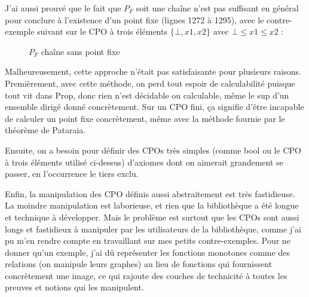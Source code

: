 \documentclass{article}
\newcommand\code[1]{{\fontfamily{lmtt}\selectfont #1}}
\theoremstyle{definition}
\begin{document}
J'ai aussi prouvé que le fait que $P_F$ soit une chaîne n'est pas suffisant en général pour conclure à l'existence d'un point fixe (lignes 1272 à 1295), avec le contre-exemple suivant sur le CPO à trois éléments $\{\bot, x1, x2 \}$ avec $\bot \leq x1 \leq x2$ :

\begin{figure}[ht]
\centering
\resizebox{0.09\linewidth}{!}
	{
	}
\caption{$P_F$ chaîne sans point fixe}
\end{figure}

\bigskip

Malheureusement, cette approche n'était pas satisfaisante pour plusieurs raisons. Premièrement, avec cette méthode, on perd tout espoir de calculabilité puisque tout vit dans \code{Prop}, donc rien n'est décidable ou calculable, même le sup d'un ensemble dirigé donné concrètement. Sur un CPO fini, ça signifie d'être incapable de calculer un point fixe concrètement, même avec la méthode fournie par le théorème de Pataraia.

Ensuite, on a besoin pour définir des CPOs très simples (comme \code{bool} ou le CPO à trois éléments utilisé ci-dessus) d'axiomes dont on aimerait grandement se passer, en l'occurrence le tiers exclu.

Enfin, la manipulation des CPO définis aussi abstraitement est très fastidieuse. La moindre manipulation est laborieuse, et rien que la bibliothèque a été longue et technique à développer. Mais le problème est surtout que les CPOs sont aussi longs et fastidieux à manipuler par les utilisateurs de la bibliothèque, comme j'ai pu m'en rendre compte en travaillant sur mes petits contre-exemples. Pour ne donner qu'un exemple, j'ai dû représenter les fonctions monotones comme des relations (on manipule leurs graphes) au lieu de fonctions qui fournissent concrètement une image, ce qui rajoute des couches de technicité à toutes les preuves et notions qui les manipulent.
\end{document}
